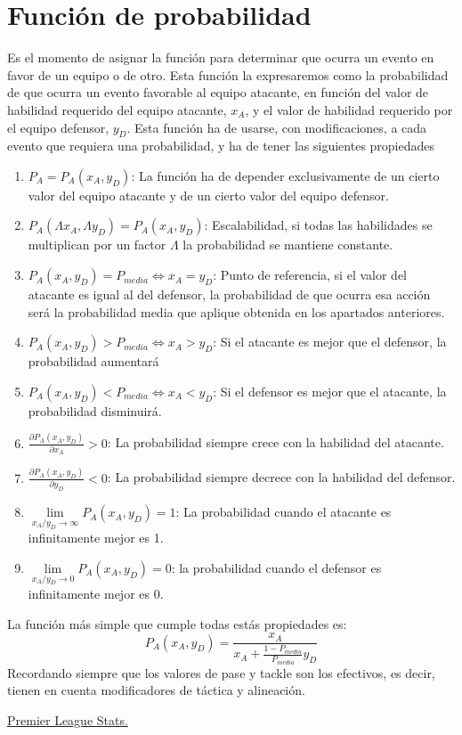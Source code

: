 \documentclass[a4paper,9pt]{article}
\begin{document}
\section{Función de probabilidad}\label{subsec:ProbFunction}
Es el momento de asignar la función para determinar que ocurra un evento en favor de un equipo o de otro. Esta función la expresaremos como la probabilidad de que ocurra un evento favorable al equipo atacante, en función del valor de habilidad requerido del equipo atacante, $x_A$, y el valor de habilidad requerido por el equipo defensor, $y_D$. Esta función ha de usarse, con modificaciones, a cada evento que requiera una probabilidad, y ha de tener las siguientes propiedades
\begin{enumerate}
	\item $P_A = P_A(x_A, y_D)$: La función ha de depender exclusivamente de un cierto valor del equipo atacante y de un cierto valor del equipo defensor.
	\item $P_A(\Lambda x_A, \Lambda y_D) = P_A(x_A, y_D)$: Escalabilidad, si todas las habilidades se multiplican por un factor $\Lambda$ la probabilidad se mantiene constante.
	\item $P_A(x_A, y_D) = P_{media} \iff x_A = y_D$: Punto de referencia, si el valor del atacante es igual al del defensor, la probabilidad de que ocurra esa acción será la probabilidad media que aplique obtenida en los apartados anteriores.
	\item $P_A(x_A, y_D) > P_{media} \iff x_A > y_D$: Si el atacante es mejor que el defensor, la probabilidad aumentará
	\item $P_A(x_A, y_D) < P_{media} \iff x_A < y_D$: Si el defensor es mejor que el atacante, la probabilidad disminuirá.
	\item $\frac{\partial P_A(x_A, y_D)}{\partial x_A} > 0 $: La probabilidad siempre crece con la habilidad del atacante.
	\item $\frac{\partial P_A(x_A, y_D)}{\partial y_D} < 0 $: La probabilidad siempre decrece con la habilidad del defensor.
	\item $\lim\limits_{x_A/y_D\to\infty} P_A(x_A, y_D) = 1$: La probabilidad cuando el atacante es infinitamente mejor es 1.
	\item $\lim\limits_{x_A/y_D\to 0} P_A(x_A, y_D) = 0$: la probabilidad cuando el defensor es infinitamente mejor es 0.
\end{enumerate}
La función más simple que cumple todas estás propiedades es:
\begin{equation}
	P_A(x_A, y_D) = \frac{x_A}{x_A+\frac{1-P_{media}}{P_{media}}y_D}
\end{equation}
Recordando siempre que los valores de pase y tackle son los efectivos, es decir, tienen en cuenta modificadores de táctica y alineación.

\newpage
\begin{thebibliography}{999}

  \href{https://www.whoscored.com/Regions/252/Tournaments/2/Seasons/7361/Stages/16368/TeamStatistics/England-Premier-League-2018-2019}{Premier League Stats.}
\end{thebibliography}
\end{document}

